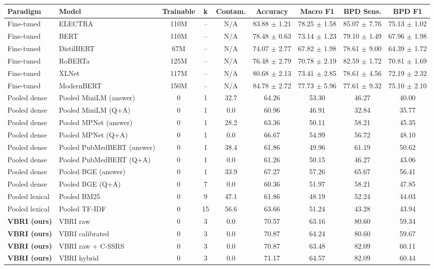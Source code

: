 \begin{tabular}{@{}llccccccc@{}}
\toprule
\textbf{Paradigm} & \textbf{Model} & \textbf{Trainable} & \textbf{k} & \textbf{Contam.} & \textbf{Accuracy} & \textbf{Macro F1} & \textbf{BPD Sens.} & \textbf{BPD F1} \\
\midrule
Fine-tuned & ELECTRA & 110M & -- & N/A & 83.88 $\pm$ 1.21 & 78.25 $\pm$ 1.58 & 85.07 $\pm$ 7.76 & 75.13 $\pm$ 1.02 \\
Fine-tuned & BERT & 110M & -- & N/A & 78.48 $\pm$ 0.63 & 73.14 $\pm$ 1.23 & 79.10 $\pm$ 1.49 & 67.96 $\pm$ 1.98 \\
Fine-tuned & DistilBERT & 67M & -- & N/A & 74.07 $\pm$ 2.77 & 67.82 $\pm$ 1.98 & 78.61 $\pm$ 9.00 & 64.39 $\pm$ 1.72 \\
Fine-tuned & RoBERTa & 125M & -- & N/A & 76.48 $\pm$ 2.79 & 70.78 $\pm$ 2.19 & 82.59 $\pm$ 1.72 & 70.81 $\pm$ 1.69 \\
Fine-tuned & XLNet & 117M & -- & N/A & 80.68 $\pm$ 2.13 & 73.41 $\pm$ 2.85 & 78.61 $\pm$ 4.56 & 72.19 $\pm$ 2.32 \\
Fine-tuned & ModernBERT & 150M & -- & N/A & 84.78 $\pm$ 2.72 & 77.73 $\pm$ 5.96 & 77.61 $\pm$ 9.32 & 75.10 $\pm$ 2.10 \\
\midrule
Pooled dense & Pooled MiniLM (answer) & 0 & 1 & 32.7 & 64.26 & 53.30 & 46.27 & 40.00 \\
Pooled dense & Pooled MiniLM (Q+A) & 0 & 1 & 0.0 & 60.96 & 46.91 & 32.84 & 35.77 \\
Pooled dense & Pooled MPNet (answer) & 0 & 1 & 28.2 & 63.36 & 50.11 & 58.21 & 45.35 \\
Pooled dense & Pooled MPNet (Q+A) & 0 & 1 & 0.0 & 66.67 & 54.99 & 56.72 & 48.10 \\
Pooled dense & Pooled PubMedBERT (answer) & 0 & 1 & 38.4 & 61.86 & 49.96 & 61.19 & 50.62 \\
Pooled dense & Pooled PubMedBERT (Q+A) & 0 & 1 & 0.0 & 61.26 & 50.15 & 46.27 & 43.06 \\
Pooled dense & Pooled BGE (answer) & 0 & 1 & 33.9 & 67.27 & 57.26 & 65.67 & 56.41 \\
Pooled dense & Pooled BGE (Q+A) & 0 & 7 & 0.0 & 60.36 & 51.97 & 58.21 & 47.85 \\
\midrule
Pooled lexical & Pooled BM25 & 0 & 9 & 47.1 & 61.86 & 48.19 & 52.24 & 44.03 \\
Pooled lexical & Pooled TF-IDF & 0 & 15 & 56.6 & 63.66 & 51.24 & 43.28 & 43.94 \\
\midrule
\textbf{VBRI (ours)} & VBRI raw & 0 & 3 & 0.0 & 70.57 & 63.16 & 80.60 & 59.34 \\
\textbf{VBRI (ours)} & VBRI calibrated & 0 & 3 & 0.0 & 70.87 & 64.24 & 80.60 & 59.67 \\
\textbf{VBRI (ours)} & VBRI raw + C-SSRS & 0 & 3 & 0.0 & 70.87 & 63.48 & 82.09 & 60.11 \\
\textbf{VBRI (ours)} & VBRI hybrid & 0 & 3 & 0.0 & 71.17 & 64.57 & 82.09 & 60.44 \\
\bottomrule
\end{tabular}
